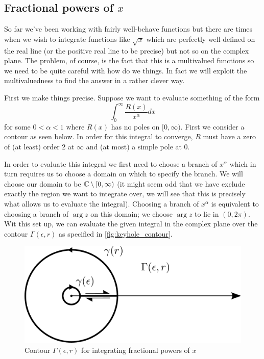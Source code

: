 \subsection{Fractional powers of $x$}
So far we've been working with fairly well-behave functions but there are times when we wish to integrate functions like $\sqrt{x}$ which are perfectly well-defined on the real line (or the positive real line to be precise) but not so on the complex plane. The problem, of course, is the fact that this is a multivalued functions so we need to be quite careful with how do we things. In fact we will exploit the multivaluedness to find the answer in a rather clever way. 

First we make things precise. Suppose we want to evaluate something of the form
$$\int_0^\infty \frac{R(x)}{x^\alpha} dx$$
for some $0 < \alpha < 1$ where $R(x)$ has no poles on $[0, \infty)$. First we consider a contour as seen below. In order for this integral to converge, $R$ must have a zero of (at least) order 2 at $\infty$ and (at most) a simple pole at 0. 

In order to evaluate this integral we first need to choose a branch of $x^\alpha$ which in turn requires us to choose a domain on which to specify the branch. We will choose our domain to be $\mathbb{C} \setminus [0, \infty)$ (it might seem odd that we have exclude exactly the region we want to integrate over, we will see that this is precisely what allows us to evaluate the integral). Choosing a branch of $x^\alpha$ is equivalent to choosing a branch of $\arg z$ on this domain; we choose $\arg z$ to lie in $(0, 2\pi)$. 
Wit this set up, we can evaluate the given integral in the complex plane over the contour $\Gamma(\epsilon, r)$ as specified in \autoref{fig:keyhole_contour}.

\begin{figure}[h]
    \centering
    \includegraphics[scale=1.1]{Images/keyhole_contour.png}
    \caption{Contour $\Gamma(\epsilon, r)$ for integrating fractional powers of $x$}
    \label{fig:keyhole_contour}
\end{figure}

